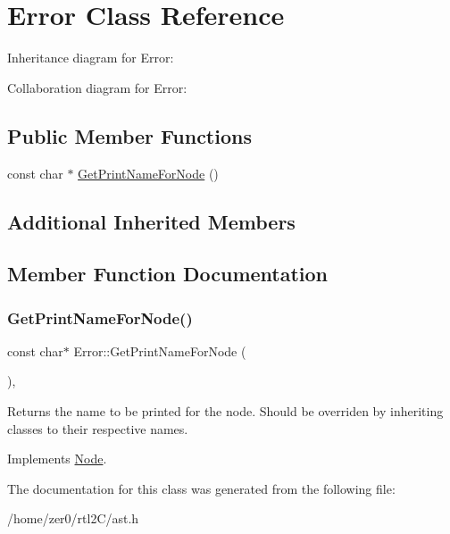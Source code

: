 \hypertarget{class_error}{}\section{Error Class Reference}
\label{class_error}


Inheritance diagram for Error\+:


Collaboration diagram for Error\+:
\subsection*{Public Member Functions}
\begin{DoxyCompactItemize}
\item 
const char $\ast$ \hyperlink{class_error_a610f5e77ca0a86ae8981ac3ed7820bf3}{Get\+Print\+Name\+For\+Node} ()
\end{DoxyCompactItemize}
\subsection*{Additional Inherited Members}


\subsection{Member Function Documentation}
\mbox{\label{class_error_a610f5e77ca0a86ae8981ac3ed7820bf3}} 
\subsubsection{\texorpdfstring{Get\+Print\+Name\+For\+Node()}{GetPrintNameForNode()}}
{\footnotesize\ttfamily const char$\ast$ Error\+::\+Get\+Print\+Name\+For\+Node (\begin{DoxyParamCaption}{ }\end{DoxyParamCaption})\hspace{0.3cm}{\ttfamily [inline]}, {\ttfamily [virtual]}}

Returns the name to be printed for the node. Should be overriden by inheriting classes to their respective names. 

Implements \hyperlink{class_node_a56e29657306ffb004d69c6929ae44269}{Node}.



The documentation for this class was generated from the following file\+:\begin{DoxyCompactItemize}
\item 
/home/zer0/rtl2\+C/ast.\+h\end{DoxyCompactItemize}
